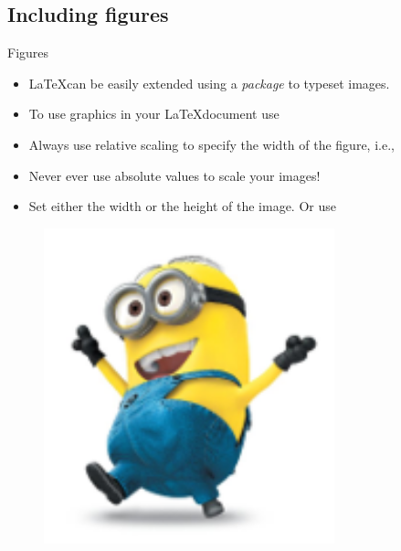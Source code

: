 \documentclass[10pt,times]{beamer}
\begin{document}
\subsection{Including figures}
\begin{frame}[fragile]{Figures}
\begin{itemize}
\item \LaTeX can be easily extended using a \emph{package} to typeset images.

\item To use graphics in your \LaTeX document use 

\item Always use relative scaling to specify the width of the figure, i.e., 

\cmmd{[width = 0.75\bs textwidth]}

\item Never ever use absolute values to scale your images!

\item Set either the width or the height of the image. Or use 

\end{itemize}
\begin{exampletwoup}
\begin{figure}
\includegraphics[width=0.75\textwidth]
                           {figs/minion}
\end{figure}
\end{exampletwoup}
\end{frame}
\end{document}
